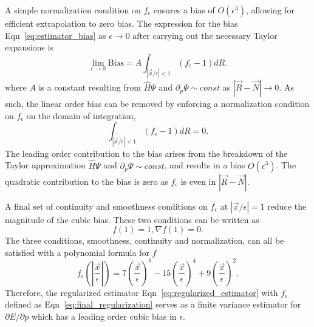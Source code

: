 \documentclass[twocolumn]{revtex4-1}
\begin{document}
A simple normalization condition on $f_\epsilon$ ensures a bias of $O(\epsilon^3)$, allowing for efficient extrapolation to zero bias.
The expression for the bias Eqn~\ref{eq:estimator_bias} as $\epsilon \rightarrow 0$ after carrying out the necessary Taylor expansions is
$$
\lim_{\epsilon\rightarrow 0}\text{Bias} =  A \int_{|\vec{x}/\epsilon|< 1} (f_\epsilon - 1) dR.
$$
where $A$ is a constant resulting from $\hat{H}\Psi$ and $\partial_p \Psi \sim const$ as $|\vec{R}-\vec{N}|\rightarrow 0$.
As such, the linear order bias can be removed by enforcing a normalization condition on $f_\epsilon$ on the domain of integration, 
\begin{equation}
\int_{|\vec{x}/\epsilon|< 1} (f_\epsilon - 1) dR = 0.
\label{eq:normalization_condition}
\end{equation}
The leading order contribution to the bias arises from the breakdown of the Taylor approximation $\hat{H}\Psi$ and $\partial_p \Psi \sim const$, and results in a bias $O(\epsilon^3)$.
The quadratic contribution to the bias is zero as $f_\epsilon$ is even in $|\vec{R}-\vec{N}|$.

A final set of continuity and smoothness conditions on $f_\epsilon$ at $|\vec{x}/\epsilon| = 1$ reduce the magnitude of the cubic bias.
These two conditions can be written as 
\begin{equation}
f(1) = 1, \nabla f(1) = 0.
\label{eq:smoothness_condition}
\end{equation}
The three conditions, smoothness, continuity and normalization, can all be satisfied with a polynomial formula for $f$
\begin{equation}
f_\epsilon(|\frac{\vec{x}}{\epsilon}|) = 7(\frac{\vec{x}}{\epsilon})^6 - 15(\frac{\vec{x}}{\epsilon})^4 + 9(\frac{\vec{x}}{\epsilon})^2.
\label{eq:final_regularization}
\end{equation}
Therefore, the regularized estimator Eqn~\ref{eq:regularized_estimator} with $f_\epsilon$ defined as Eqn~\ref{eq:final_regularization} serves as a finite variance estimator for $\partial E/\partial p$ which has a leading order cubic bias in $\epsilon$.
\end{document}
